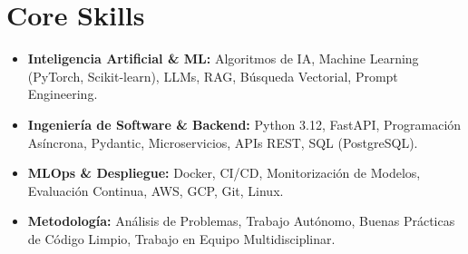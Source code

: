 \documentclass[a4paper,10pt]{article}
\begin{document}
\section{Core Skills}
\begin{itemize}
  \item \textbf{Inteligencia Artificial \& ML:} Algoritmos de IA, Machine Learning (PyTorch, Scikit-learn), LLMs, RAG, Búsqueda Vectorial, Prompt Engineering.
  \item \textbf{Ingeniería de Software \& Backend:} Python 3.12, FastAPI, Programación Asíncrona, Pydantic, Microservicios, APIs REST, SQL (PostgreSQL).
  \item \textbf{MLOps \& Despliegue:} Docker, CI/CD, Monitorización de Modelos, Evaluación Continua, AWS, GCP, Git, Linux.
  \item \textbf{Metodología:} Análisis de Problemas, Trabajo Autónomo, Buenas Prácticas de Código Limpio, Trabajo en Equipo Multidisciplinar.
\end{itemize}
\end{document}
